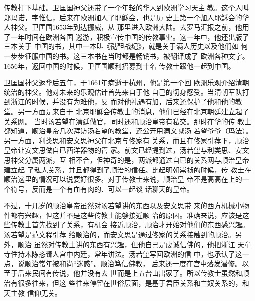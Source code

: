 传教打下基础。卫匡国神父还带了一个年轻的华人到欧洲学习天主%
教。这个人叫郑玛诺，字惟信，后来在欧洲加人了耶稣会，也是历%
史上第一个加人耶稣会的华人神父。卫匡国1653年到达挪威，从%
那里进入欧洲大陆。去罗马汇报之前，他用了一年时间在欧洲各国%
巡游，积极宣传中国的传教事业。这一年中，他还出版了三本关于%
中国的书，其中一本叫《鞑靼战纪》，就是关于满人历史以及他们如%
何一步步征服中国的书。这三本书在当时都是畅销书，被翻译成了%
欧洲各种文字。1656年，返回中国的时候，卫匡国顺利招募到十名%
传教士跟他一起到中国。%
\par
卫匡国神父返华后五年，于1661年病逝于杭州，他是第一个回%
欧洲乐观介绍清朝统治的神父。他对未来的乐观估计首先来自于他%
自己的切身感受。当清朝军队打到浙江的时候，并没有为难他，反%
而对他礼遇有加，后来还保护了他和他的教堂。另一方面是来自于%
北京耶稣会传教士的消息，他们已经在北京朝廷建立起了关系网。%
当时汤若望在清廷做官，同时还和顺治皇帝有私交。那时在华的传%
教士都知道，顺治皇帝几次拜访汤若望的教堂，还公开用满文喊汤%
若望爷爷（玛法）。另一方面，利类思和安文思神父在北京与佟家有%
关系，而且在佟家引荐下，顺治皇帝让安文思做自已西洋器物的管%
家。前文已经提到过，汤若望与利类思、安文思神父分属两派，互%
相不合，但神奇的是，两派都通过自已的关系网与顺治皇帝建立起%
了私人关系，并且都得到了顺治的信任。比起明朝崇祯的时候，传%
教士在顺治这里的情况可以说要好很多。对于传教士来说，顺治皇%
帝不是高高在上的一个符号，反而是一个有血有肉的、可以一起谈%
话聊天的皇帝。%
\par
不过，十几岁的顺治皇帝虽然对汤若望讲的东西以及安文思带%
来的西方机械小物件都有兴趣，但这并不是这些传教士能够接近顺%
治的原因。准确来说，应该是这些传教士首先找到了关系，有机会%
接近顺治，顺治才开始对他们的东西感兴趣。汤若望是范文程引荐%
给顺治的，而安文思是通过佟家的关系接触到的顺治。另外，顺治%
虽然对传教士讲的东西有兴趣，但他自己是虔诚信佛的，他把浙江%
天童寺住持木陈忞请人宫中内廷，常年讲法。汤若望写回欧洲的信%
中，也承认了这一点，说顺治常年被和尚“迷惑”。顺治笃信佛教，%
后来还一度在宫中落发潜修。以至于后来民间有传说，他并没有去%
世而是上五台山出家了。所以传教士虽然和顺治有很多往来，但这%
些往来停留在世俗层面，是基于君臣关系和主奴关系的，和天主教%
信仰无关。%
